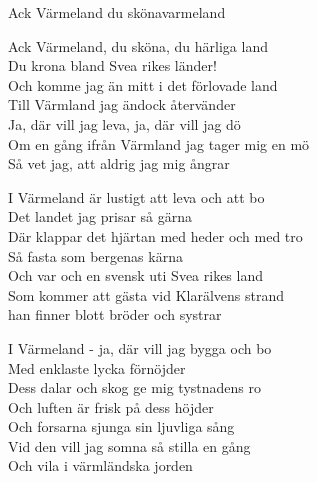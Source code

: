 \begin{song}{Ack Värmeland du sköna}{varmeland}
\begin{vers}
Ack Värmeland, du sköna, du härliga land\\
Du krona bland Svea rikes länder!\\
Och komme jag än mitt i det förlovade land\\
Till Värmland jag ändock återvänder\\
Ja, där vill jag leva, ja, där vill jag dö\\
Om en gång ifrån Värmland jag tager mig en mö\\
Så vet jag, att aldrig jag mig ångrar\\
\end{vers}
\begin{vers}
I Värmeland är lustigt att leva och att bo\\
Det landet jag prisar så gärna\\
Där klappar det hjärtan med heder och med tro\\
Så fasta som bergenas kärna\\
Och var och en svensk uti Svea rikes land\\
Som kommer att gästa vid Klarälvens strand\\
han finner blott bröder och systrar\\
\end{vers}
\begin{vers}
I Värmeland - ja, där vill jag bygga och bo\\
Med enklaste lycka förnöjder\\
Dess dalar och skog ge mig tystnadens ro\\
Och luften är frisk på dess höjder\\
Och forsarna sjunga sin ljuvliga sång\\
Vid den vill jag somna så stilla en gång\\
Och vila i värmländska jorden\\
\end{vers}
\end{song}
